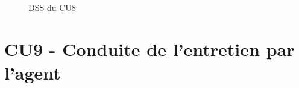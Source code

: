 \begin{figure}[H]
\noindent{}
\caption{DSS du CU8}
\end{figure}


\section{CU9 - Conduite de l’entretien par l’agent}

